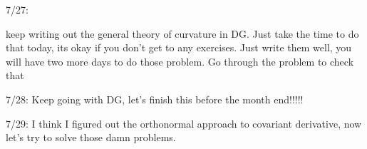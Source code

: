 7/27:

keep writing out the general theory of curvature in DG. Just take the time to do that today, its okay if you don't get to any exercises. Just write them well, you will have two more days to do those problem. Go through the problem to check that 


7/28: Keep going with DG, let's finish this before the month end!!!!!

7/29: I think I figured out the orthonormal approach to covariant derivative, now let's try to solve those damn problems.